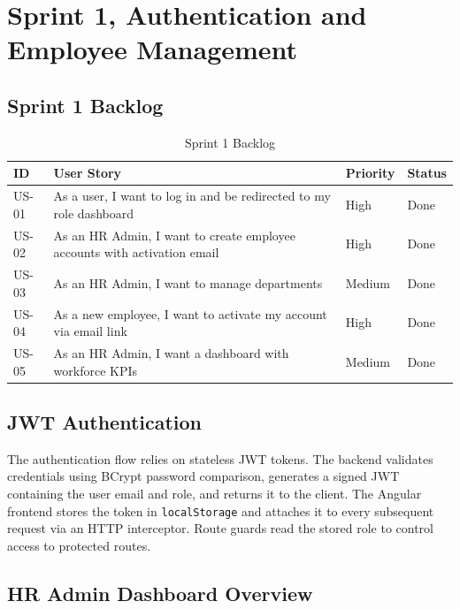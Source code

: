 \documentclass[12pt,a4paper]{report}
\newcommand{\cmark}{\ding{51}}
\begin{document}
\section{Sprint 1, Authentication and Employee Management}

\subsection{Sprint 1 Backlog}

\begin{table}[H]
\centering
\caption{Sprint 1 Backlog}
\label{tab:s1_backlog}
\begin{tabular}{|C{1.2cm}|L{7cm}|C{2cm}|C{2.5cm}|}
\hline
{}
\textbf{ID} & \textbf{User Story} & \textbf{Priority} & \textbf{Status} \\
\hline
US-01 & As a user, I want to log in and be redirected to my role dashboard & High & \cmark Done \\
\hline
US-02 & As an HR Admin, I want to create employee accounts with activation email & High & \cmark Done \\
\hline
US-03 & As an HR Admin, I want to manage departments & Medium & \cmark Done \\
\hline
US-04 & As a new employee, I want to activate my account via email link & High & \cmark Done \\
\hline
US-05 & As an HR Admin, I want a dashboard with workforce KPIs & Medium & \cmark Done \\
\hline
\end{tabular}
\end{table}

\subsection{JWT Authentication}

The authentication flow relies on stateless JWT tokens. The backend validates credentials
using BCrypt password comparison, generates a signed JWT containing the user email and
role, and returns it to the client. The Angular frontend stores the token in
\texttt{localStorage} and attaches it to every subsequent request via an HTTP interceptor.
Route guards read the stored role to control access to protected routes.

\subsection{HR Admin Dashboard Overview}
\end{document}
